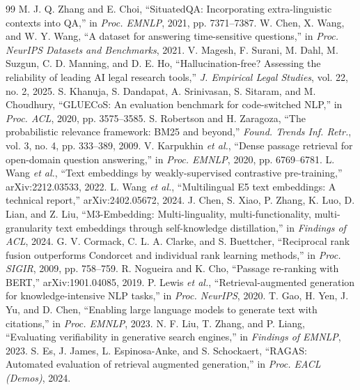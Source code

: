\documentclass[conference]{IEEEtran}
\begin{document}
\begin{thebibliography}{99}
\footnotesize
{} M. J. Q. Zhang and E. Choi, ``SituatedQA: Incorporating extra-linguistic contexts into QA,'' in \emph{Proc. EMNLP}, 2021, pp. 7371--7387.
 W. Chen, X. Wang, and W. Y. Wang, ``A dataset for answering time-sensitive questions,'' in \emph{Proc. NeurIPS Datasets and Benchmarks}, 2021.
 V. Magesh, F. Surani, M. Dahl, M. Suzgun, C. D. Manning, and D. E. Ho, ``Hallucination-free? Assessing the reliability of leading AI legal research tools,'' \emph{J. Empirical Legal Studies}, vol. 22, no. 2, 2025.
 S. Khanuja, S. Dandapat, A. Srinivasan, S. Sitaram, and M. Choudhury, ``GLUECoS: An evaluation benchmark for code-switched NLP,'' in \emph{Proc. ACL}, 2020, pp. 3575--3585.
 S. Robertson and H. Zaragoza, ``The probabilistic relevance framework: BM25 and beyond,'' \emph{Found. Trends Inf. Retr.}, vol. 3, no. 4, pp. 333--389, 2009.
 V. Karpukhin \emph{et al.}, ``Dense passage retrieval for open-domain question answering,'' in \emph{Proc. EMNLP}, 2020, pp. 6769--6781.
 L. Wang \emph{et al.}, ``Text embeddings by weakly-supervised contrastive pre-training,'' arXiv:2212.03533, 2022.
 L. Wang \emph{et al.}, ``Multilingual E5 text embeddings: A technical report,'' arXiv:2402.05672, 2024.
 J. Chen, S. Xiao, P. Zhang, K. Luo, D. Lian, and Z. Liu, ``M3-Embedding: Multi-linguality, multi-functionality, multi-granularity text embeddings through self-knowledge distillation,'' in \emph{Findings of ACL}, 2024.
 G. V. Cormack, C. L. A. Clarke, and S. Buettcher, ``Reciprocal rank fusion outperforms Condorcet and individual rank learning methods,'' in \emph{Proc. SIGIR}, 2009, pp. 758--759.
 R. Nogueira and K. Cho, ``Passage re-ranking with BERT,'' arXiv:1901.04085, 2019.
 P. Lewis \emph{et al.}, ``Retrieval-augmented generation for knowledge-intensive NLP tasks,'' in \emph{Proc. NeurIPS}, 2020.
 T. Gao, H. Yen, J. Yu, and D. Chen, ``Enabling large language models to generate text with citations,'' in \emph{Proc. EMNLP}, 2023.
 N. F. Liu, T. Zhang, and P. Liang, ``Evaluating verifiability in generative search engines,'' in \emph{Findings of EMNLP}, 2023.
 S. Es, J. James, L. Espinosa-Anke, and S. Schockaert, ``RAGAS: Automated evaluation of retrieval augmented generation,'' in \emph{Proc. EACL (Demos)}, 2024.

\end{thebibliography}
\end{document}
